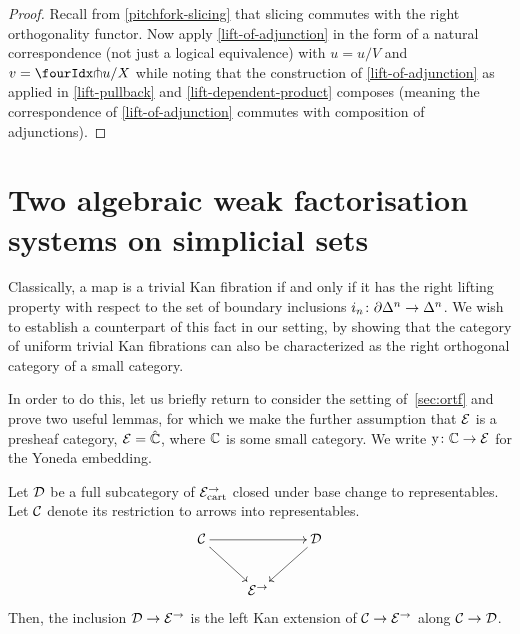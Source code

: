 \documentclass[reqno,10pt,a4paper,oneside]{amsart}
\begin{document}
\begin{proof}
Recall from \cref{pitchfork-slicing} that slicing commutes with the right orthogonality functor.
Now apply \cref{lift-of-adjunction} in the form of a natural correspondence (not just a logical equivalence) with $u = u/V$ and $v = \liftr{u}/X$ while noting that the construction of \cref{lift-of-adjunction} as applied in \cref{lift-pullback} and \cref{lift-dependent-product} composes (meaning the correspondence of \cref{lift-of-adjunction} commutes with composition of adjunctions).
\end{proof}



\section{Two algebraic weak factorisation systems on simplicial sets}
\label{trivial-kan-fibrations}

 
 

 
Classically, a map is a  trivial Kan fibration if and only if it has the right lifting property with respect to the
set of boundary inclusions $i_n \co \partial \Delta^n \to \Delta^n$. We wish to establish a counterpart of 
this fact in our setting, by showing that the category of uniform trivial Kan fibrations can also be 
characterized as the right orthogonal category of  a small category.







\medskip

\newcommand{\yon}{\mathrm{y}} 

In order to do this, let us briefly return to consider the setting of~\cref{sec:ortf} and prove two useful lemmas,
for which we make the further assumption that $\catE$ is a presheaf category, \ie $\catE = \hat{\cat{C}}$, where $\catC$ is some small category. We write $\yon \co \cat{C} \to \catE$ for the Yoneda embedding.

\begin{lemma}
\label{left-kan-extension-of-representables}
Let $\cal{D}$ be a full subcategory of $\catE_{\cart}^{\to}$ closed under base change to representables.
Let $\cal{C}$ denote its restriction to arrows into representables.
\[
\xymatrix{
  \cal{C}
  \ar[rr]
  \ar[dr]
&&
  \cal{D}
  \ar[dl]
\\&
  \catE^{\to}
}
\]
Then, the inclusion $\cal{D} \to \catE^{\to}$ is the left Kan extension of $\cal{C} \to \catE^{\to}$ along $\cal{C} \to \cal{D}$.
\end{lemma}
\end{document}
